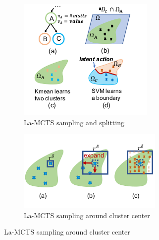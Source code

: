 \documentclass[bibliography=totoc]{scrartcl}
\begin{document}
\begin{figure}[h!]
    \centering
    \begin{subfigure}[b]{0.3\linewidth}
        \includegraphics[width=\textwidth]{img/lamcts_1.png}
        \caption{La-MCTS sampling and splitting \cite{DBLP:journals/corr/abs-2007-00708}}
        \label{fig:mesh1}
    \end{subfigure}
    \hspace{0.02\textwidth}
    \begin{subfigure}[b]{0.3\linewidth}
        \centering
        \includegraphics[width=\textwidth]{img/lamcts_2.png}
        \caption{La-MCTS sampling around cluster center \cite{DBLP:journals/corr/abs-2007-00708}}
        \label{fig:mesh1}
    \end{subfigure}
\end{figure}
\end{document}
